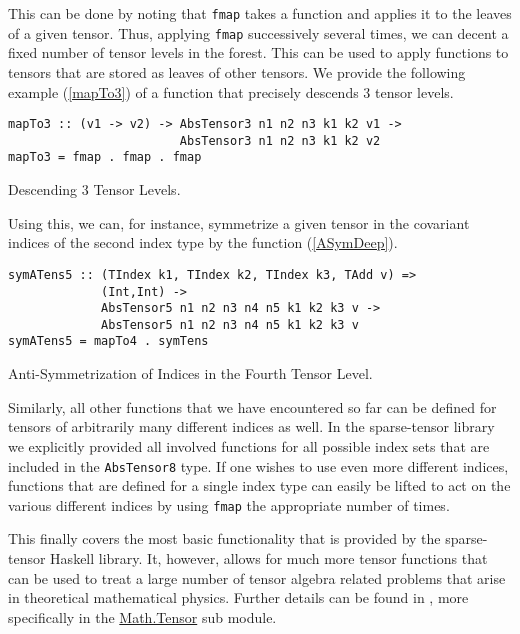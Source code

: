 This can be done by noting that \texttt{fmap} takes a function and applies it to the leaves of a given tensor. Thus, applying \texttt{fmap} successively several times, we can decent a fixed number of tensor levels in the forest. This can be used to apply functions to tensors that are stored as leaves of other tensors. We provide the following example (\ref{mapTo3}) of a function that precisely descends $3$ tensor levels.
\begin{listing}[hbt!]
\begin{verbatim}
mapTo3 :: (v1 -> v2) -> AbsTensor3 n1 n2 n3 k1 k2 v1 -> 
                        AbsTensor3 n1 n2 n3 k1 k2 v2
mapTo3 = fmap . fmap . fmap
\end{verbatim}
\caption{Descending 3 Tensor Levels.}\label{mapTo3}
\end{listing}
Using this, we can, for instance, symmetrize a given tensor in the covariant indices of the second index type by the function (\ref{ASymDeep}).
\begin{listing}[hbt!]
\begin{verbatim}
symATens5 :: (TIndex k1, TIndex k2, TIndex k3, TAdd v) =>
             (Int,Int) ->
             AbsTensor5 n1 n2 n3 n4 n5 k1 k2 k3 v ->
             AbsTensor5 n1 n2 n3 n4 n5 k1 k2 k3 v
symATens5 = mapTo4 . symTens
\end{verbatim} 
\caption{Anti-Symmetrization of Indices in the Fourth Tensor Level. }\label{ASymDeep}
\end{listing}
Similarly, all other functions that we have encountered so far can be defined for tensors of arbitrarily many different indices as well. In the sparse-tensor library we explicitly provided all involved functions for all possible index sets that are included in the \texttt{AbsTensor8} type. If one wishes to use even more different indices, functions that are defined for a single index type can easily be lifted to act on the various different indices by using \texttt{fmap} the appropriate number of times. 

This finally covers the most basic functionality that is provided by the sparse-tensor Haskell library. It, however, allows for much more tensor functions that can be used to treat a large number of tensor algebra related problems that arise in theoretical mathematical physics. 
Further details can be found in \cite{sparse-tensor}, more specifically in the \href{http://hackage.haskell.org/package/sparse-tensor-0.2.1.1/docs/Math-Tensor.html}{Math.Tensor} sub module.

